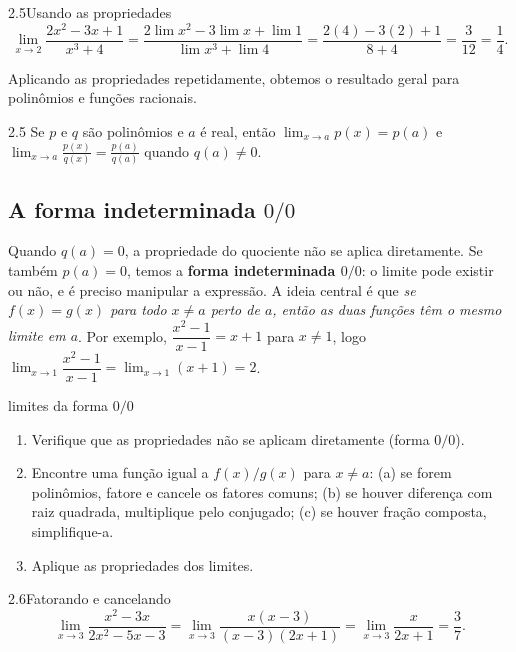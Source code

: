 \begin{exemplo}{2.5}{Usando as propriedades}
\[
\lim_{x\to2}\frac{2x^2-3x+1}{x^3+4}
=\frac{2\lim x^2-3\lim x+\lim 1}{\lim x^3+\lim 4}
=\frac{2(4)-3(2)+1}{8+4}=\frac{3}{12}=\frac14 .
\]
\end{exemplo}

Aplicando as propriedades repetidamente, obtemos o resultado geral para polinômios e
funções racionais.

\begin{teorema}{2.5}
Se $p$ e $q$ são polinômios e $a$ é real, então
$\displaystyle\lim_{x\to a}p(x)=p(a)$ e
$\displaystyle\lim_{x\to a}\frac{p(x)}{q(x)}=\frac{p(a)}{q(a)}$ quando $q(a)\neq0$.
\end{teorema}

\subsection{A forma indeterminada $0/0$}

Quando $q(a)=0$, a propriedade do quociente não se aplica diretamente. Se também $p(a)=0$,
temos a \textbf{forma indeterminada $0/0$}: o limite pode existir ou não, e é preciso
manipular a expressão. A ideia central é que \emph{se $f(x)=g(x)$ para todo $x\neq a$
perto de $a$, então as duas funções têm o mesmo limite em $a$}. Por exemplo,
$\dfrac{x^2-1}{x-1}=x+1$ para $x\neq1$, logo
$\lim_{x\to1}\dfrac{x^2-1}{x-1}=\lim_{x\to1}(x+1)=2$.

\begin{estrategia}{limites da forma $0/0$}
\begin{enumerate}[label=\arabic*.]
\item Verifique que as propriedades não se aplicam diretamente (forma $0/0$).
\item Encontre uma função igual a $f(x)/g(x)$ para $x\neq a$:
  (a) se forem polinômios, fatore e cancele os fatores comuns;
  (b) se houver diferença com raiz quadrada, multiplique pelo conjugado;
  (c) se houver fração composta, simplifique-a.
\item Aplique as propriedades dos limites.
\end{enumerate}
\end{estrategia}

\begin{exemplo}{2.6}{Fatorando e cancelando}
\[
\lim_{x\to3}\frac{x^2-3x}{2x^2-5x-3}=\lim_{x\to3}\frac{x(x-3)}{(x-3)(2x+1)}
=\lim_{x\to3}\frac{x}{2x+1}=\frac37 .
\]
\end{exemplo}

